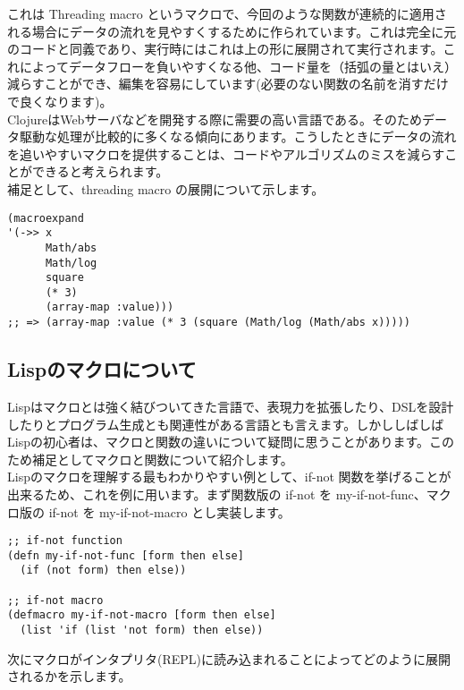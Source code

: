 \documentclass[a4paper, dvipdfmx, 12pt]{article}
\begin{document}
これは Threading macro というマクロで、今回のような関数が連続的に適用される場合にデータの流れを見やすくするために作られています。これは完全に元のコードと同義であり、実行時にはこれは上の形に展開されて実行されます。これによってデータフローを負いやすくなる他、コード量を（括弧の量とはいえ）減らすことができ、編集を容易にしています(必要のない関数の名前を消すだけで良くなります)。\\

ClojureはWebサーバなどを開発する際に需要の高い言語である。そのためデータ駆動な処理が比較的に多くなる傾向にあります。こうしたときにデータの流れを追いやすいマクロを提供することは、コードやアルゴリズムのミスを減らすことができると考えられます。\\

補足として、threading macro の展開について示します。\\
\begin{verbatim}
(macroexpand  
'(->> x 
      Math/abs 
      Math/log
      square 
      (* 3) 
      (array-map :value)))
;; => (array-map :value (* 3 (square (Math/log (Math/abs x)))))
\end{verbatim}

\subsection{Lispのマクロについて}
\label{sec:orgac6b1ad}
Lispはマクロとは強く結びついてきた言語で、表現力を拡張したり、DSLを設計したりとプログラム生成とも関連性がある言語とも言えます。しかししばしばLispの初心者は、マクロと関数の違いについて疑問に思うことがあります。このため補足としてマクロと関数について紹介します。\\

Lispのマクロを理解する最もわかりやすい例として、if-not 関数を挙げることが出来るため、これを例に用います。まず関数版の if-not を my-if-not-func、マクロ版の if-not を my-if-not-macro とし実装します。\\

\begin{verbatim}
;; if-not function 
(defn my-if-not-func [form then else] 
  (if (not form) then else))

;; if-not macro 
(defmacro my-if-not-macro [form then else]
  (list 'if (list 'not form) then else))
\end{verbatim}

次にマクロがインタプリタ(REPL)に読み込まれることによってどのように展開されるかを示します。\\
\end{document}
